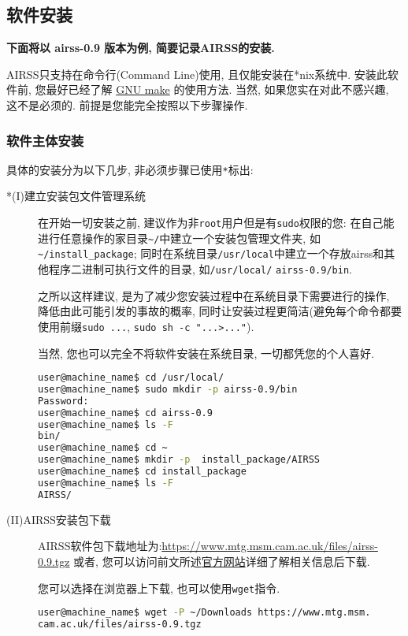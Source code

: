 \documentclass[a4paper, 10pt]{article}
\begin{document}
    \subsection{软件安装}
      \textbf{下面将以 airss-0.9 版本为例, 简要记录AIRSS的安装.}

      AIRSS只支持在命令行(Command Line)使用, 且仅能安装在*nix系统中. 安装此软件前, 您最好已经了解 \href{https://www.gnu.org/software/make/manual/}{GNU make} 的使用方法. 当然, 如果您实在对此不感兴趣, 这不是必须的. 前提是您能完全按照以下步骤操作.
      
      \subsubsection{软件主体安装}
        具体的安装分为以下几步, 非必须步骤已使用\verb|*|标出:
        \begin{description}
          \item [*(I)建立安装包文件管理系统] 在开始一切安装之前, 建议作为非\verb|root|用户但是有\verb|sudo|权限的您: 在自己能进行任意操作的家目录\verb|~/|中建立一个安装包管理文件夹, 如\verb|~/install_package|; 同时在系统目录\verb|/usr/local|中建立一个存放airss和其他程序二进制可执行文件的目录, 如\verb|/usr/local/| \verb|airss-0.9/bin|. 
          
          之所以这样建议, 是为了减少您安装过程中在系统目录下需要进行的操作, 降低由此可能引发的事故的概率, 同时让安装过程更简洁(避免每个命令都要使用前缀\verb|sudo ...|, \verb|sudo sh -c "...>..."|). 
          
          当然, 您也可以完全不将软件安装在系统目录, 一切都凭您的个人喜好.
          \begin{lstlisting}[language={bash}]
user@machine_name$ cd /usr/local/
user@machine_name$ sudo mkdir -p airss-0.9/bin
Password:
user@machine_name$ cd airss-0.9
user@machine_name$ ls -F 
bin/
user@machine_name$ cd ~
user@machine_name$ mkdir -p  install_package/AIRSS
user@machine_name$ cd install_package
user@machine_name$ ls -F
AIRSS/
          \end{lstlisting}

          \item [(II)AIRSS安装包下载]AIRSS软件包下载地址为:\url{https://www.mtg.msm.cam.ac.uk/files/airss-0.9.tgz}
           或者, 您可以访问前文所述\href{https://www.mtg.msm.cam.ac.uk/Codes/AIRSS}{官方网站}详细了解相关信息后下载.

           您可以选择在浏览器上下载, 也可以使用\verb|wget|指令.
           
           \begin{lstlisting}[language={bash}]
user@machine_name$ wget -P ~/Downloads https://www.mtg.msm.
cam.ac.uk/files/airss-0.9.tgz
          \end{lstlisting}


\end{description}
\end{document}
